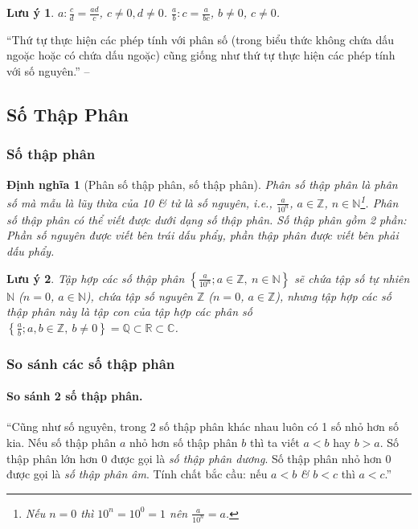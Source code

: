 \documentclass{article}
\numberwithin{equation}{section}
\newtheorem{dinhnghia}{Định nghĩa}[section]
\newtheorem{luuy}{Lưu ý}[section]
\begin{document}
\begin{luuy}
	$a:\frac{c}{d} = \frac{ad}{c}$, $c\ne 0,d\ne 0$. $\frac{a}{b}:c = \frac{a}{bc}$, $b\ne 0$, $c\ne 0$.
\end{luuy}
``Thứ tự thực hiện các phép tính với phân số (trong biểu thức không chứa dấu ngoặc hoặc có chứa dấu ngoặc) cũng giống như thứ tự thực hiện các phép tính với số nguyên.'' -- \cite[p. 42]{SGK_Toan_6_Canh_Dieu_tap_2}


\subsection{Số Thập Phân}

\subsubsection{Số thập phân}

\begin{dinhnghia}[Phân số thập phân, số thập phân]
	\emph{Phân số thập phân} là phân số mà mẫu là lũy thừa của 10 \textit{\&} tử là số nguyên, i.e., $\frac{a}{10^n}$, $a\in\mathbb{Z}$, $n\in\mathbb{N}$\footnote{Nếu $n = 0$ thì $10^n = 10^0 = 1$ nên $\frac{a}{10^n} = a$.}. Phân số thập phân có thể viết được dưới dạng số thập phân. Số thập phân gồm 2 phần: \emph{Phần số nguyên} được viết bên trái dấu phẩy, \emph{phần thập phân} được viết bên phải dấu phẩy.
\end{dinhnghia}

\begin{luuy}
	Tập hợp các số thập phân $\left\{\frac{a}{10^n};a\in\mathbb{Z},\ n\in\mathbb{N}\right\}$ sẽ chứa tập số tự nhiên $\mathbb{N}$ ($n = 0$, $a\in\mathbb{N}$), chứa tập số nguyên $\mathbb{Z}$ ($n = 0$, $a\in\mathbb{Z}$), nhưng tập hợp các số thập phân này là tập con của tập hợp các phân số $\left\{\frac{a}{b};a,b\in\mathbb{Z},\ b\ne 0\right\} = \mathbb{Q}\subset\mathbb{R}\subset\mathbb{C}$.
\end{luuy}

\subsubsection{So sánh các số thập phân}

\paragraph{So sánh 2 số thập phân.} ``Cũng như số nguyên, trong 2 số thập phân khác nhau luôn có 1 số nhỏ hơn số kia. Nếu số thập phân $a$ nhỏ hơn số thập phân $b$ thì ta viết $a < b$ hay $b > a$. Số thập phân lớn hơn 0 được gọi là \emph{số thập phân dương}. Số thập phân nhỏ hơn 0 được gọi là \emph{số thập phân âm}. Tính chất bắc cầu: nếu $a < b$ \textit{\&} $b < c$ thì $a < c$.'' \cite[p. 45]{SGK_Toan_6_Canh_Dieu_tap_2}
\end{document}
